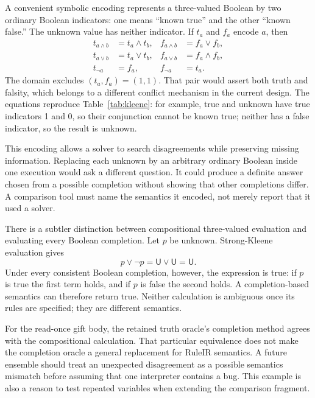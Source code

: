 \documentclass[12pt,a4paper,oneside,openany]{book}
\newcommand{\Unknown}{\mathsf{U}}
\begin{document}
A convenient symbolic encoding represents a three-valued Boolean by two ordinary
Boolean indicators: one means ``known true'' and the other ``known false.'' The
unknown value has neither indicator. If $t_a$ and $f_a$ encode $a$, then
\begin{align}
 t_{a\land b}&=t_a\land t_b,& f_{a\land b}&=f_a\lor f_b,\label{eq:kleene-and}\\
 t_{a\lor b}&=t_a\lor t_b,& f_{a\lor b}&=f_a\land f_b,\label{eq:kleene-or}\\
 t_{\neg a}&=f_a,& f_{\neg a}&=t_a.\label{eq:kleene-not}
\end{align}
The domain excludes $(t_a,f_a)=(1,1)$. That pair would assert both truth and
falsity, which belongs to a different conflict mechanism in the current design.
The equations reproduce Table~\ref{tab:kleene}: for example, true and unknown
have true indicators 1 and 0, so their conjunction cannot be known true; neither
has a false indicator, so the result is unknown.

This encoding allows a solver to search disagreements while preserving missing
information. Replacing each unknown by an arbitrary ordinary Boolean inside
one execution would ask a different question. It could produce a definite answer
chosen from a possible completion without showing that other completions differ.
A comparison tool must name the semantics it encoded, not merely report that it
used a solver.

There is a subtler distinction between compositional three-valued evaluation
and evaluating every Boolean completion. Let $p$ be unknown. Strong-Kleene
evaluation gives
\begin{equation}
 p\lor\neg p=\Unknown\lor\Unknown=\Unknown.
 \label{eq:unknown-tautology}
\end{equation}
Under every consistent Boolean completion, however, the expression is true:
if $p$ is true the first term holds, and if $p$ is false the second holds. A
completion-based semantics can therefore return true. Neither calculation is
ambiguous once its rules are specified; they are different semantics.

For the read-once gift body, the retained truth oracle's completion method agrees
with the compositional calculation. That particular equivalence does not make
the completion oracle a general replacement for RuleIR semantics. A future
ensemble should treat an unexpected disagreement as a possible semantics
mismatch before assuming that one interpreter contains a bug. This example is
also a reason to test repeated variables when extending the comparison fragment.
\end{document}
